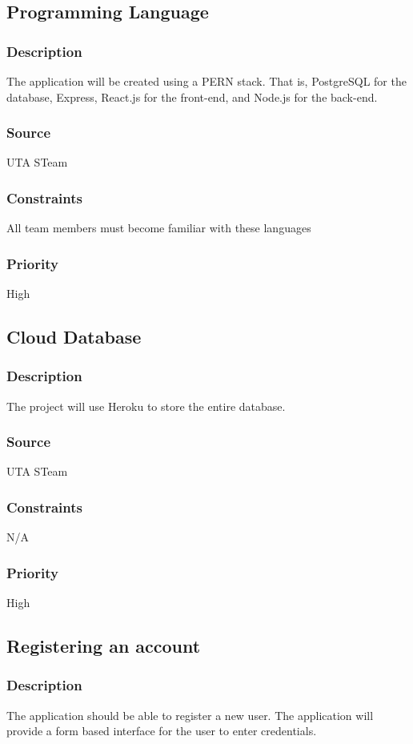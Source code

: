 
\subsection{Programming Language}
\subsubsection{Description}
The application will be created using a PERN stack. That is, PostgreSQL for the database, Express, React.js for the front-end, and Node.js for the back-end.
\subsubsection{Source}
UTA STeam
\subsubsection{Constraints}
All team members must become familiar with these languages
\subsubsection{Priority}
High

\subsection{Cloud Database}
\subsubsection{Description}
The project will use Heroku to store the entire database. 
\subsubsection{Source}
UTA STeam
\subsubsection{Constraints}
N/A
\subsubsection{Priority}
High

\subsection{Registering an account}
\subsubsection{Description}
The application should be able to register a new user. The application will provide a form based interface for the user to enter credentials.
